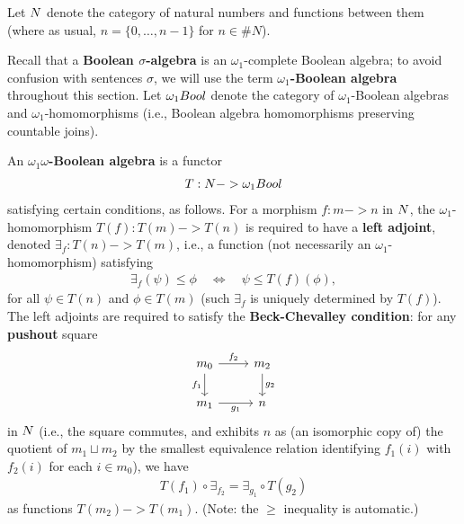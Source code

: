 \documentclass[11pt]{article}
\newcommand*\defn{\textbf}
\begin{document}
Let $\*N$ denote the category of natural numbers and functions between them (where as usual, $n = \{0, \dotsc, n-1\}$ for $n \in \#N$).  

Recall that a \defn{Boolean $\sigma$-algebra} is an $\omega_1$-complete Boolean algebra; to avoid confusion with sentences $\sigma$, we will use the term \defn{$\omega_1$-Boolean algebra} throughout this section.  Let $\*{\omega_1 Bool}$ denote the category of $\omega_1$-Boolean algebras and $\omega_1$-homomorphisms (i.e., Boolean algebra homomorphisms preserving countable joins).


An \defn{$\omega_1\omega$-Boolean algebra} is a functor
\begin{align*}
T : \*N -> \*{\omega_1 Bool}
\end{align*}
satisfying certain conditions, as follows.  For a morphism $f : m -> n$ in $\*N$, the $\omega_1$-homomorphism $T(f) : T(m) -> T(n)$ is required to have a \defn{left adjoint}, denoted $\exists_f : T(n) -> T(m)$, i.e., a function (not necessarily an $\omega_1$-homomorphism) satisfying
\begin{align*}
\exists_f(\psi) \le \phi  \quad\iff\quad  \psi \le T(f)(\phi),
\tag{$*$}
\end{align*}
for all $\psi \in T(n)$ and $\phi \in T(m)$ (such $\exists_f$ is uniquely determined by $T(f)$).  The left adjoints are required to satisfy the \defn{Beck-Chevalley condition}: for any \defn{pushout} square
\begin{equation*}
\begin{tikzcd}
m_0 \dar[swap]{f_1} \rar{f_2} & m_2 \dar{g_2} \\
m_1 \rar[swap]{g_1} & n
\end{tikzcd}
\end{equation*}
in $\*N$ (i.e., the square commutes, and exhibits $n$ as (an isomorphic copy of) the quotient of $m_1 \sqcup m_2$ by the smallest equivalence relation identifying $f_1(i)$ with $f_2(i)$ for each $i \in m_0$), we have
\begin{align*}
T(f_1) \circ \exists_{f_2} = \exists_{g_1} \circ T(g_2)  \tag{$**$}
\end{align*}
as functions $T(m_2) -> T(m_1)$.  (Note: the $\ge$ inequality is automatic.)
\end{document}
